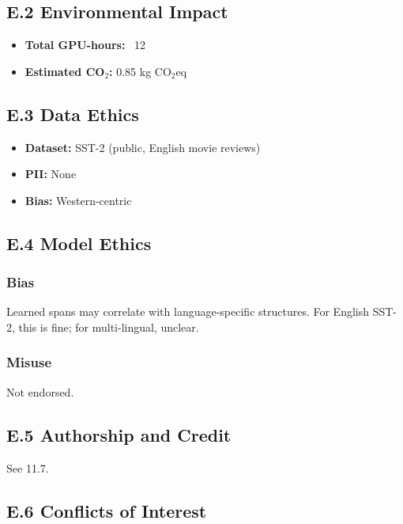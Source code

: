 \subsection{E.2 Environmental Impact}

\begin{itemize}
\item \textbf{Total GPU-hours:} ~12
\item \textbf{Estimated CO$_2$:} 0.85 kg CO$_2$eq

\end{itemize}
\subsection{E.3 Data Ethics}

\begin{itemize}
\item \textbf{Dataset:} SST-2 (public, English movie reviews)
\item \textbf{PII:} None
\item \textbf{Bias:} Western-centric

\end{itemize}
\subsection{E.4 Model Ethics}

\subsubsection{Bias}

Learned spans may correlate with language-specific structures. For English 
SST-2, this is fine; for multi-lingual, unclear.

\subsubsection{Misuse}

Not endorsed.

\subsection{E.5 Authorship and Credit}

See  11.7.

\subsection{E.6 Conflicts of Interest}

